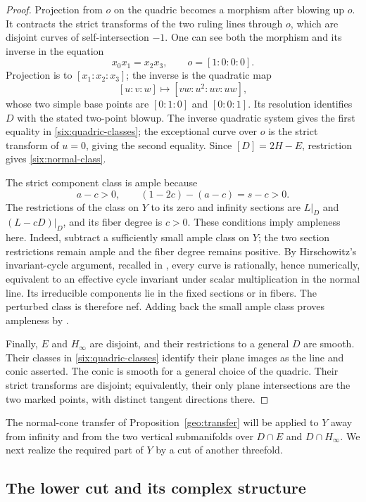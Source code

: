 \begin{proof}
Projection from \(o\) on the quadric becomes a morphism after blowing
up \(o\).  It contracts the strict transforms of the two ruling lines
through \(o\), which are disjoint curves of self-intersection \(-1\).
One can see both the morphism and its inverse in the equation
\[
 x_0x_1=x_2x_3,\qquad o=[1:0:0:0].
\]
Projection is to \([x_1:x_2:x_3]\); the inverse is the quadratic map
\[
 [u:v:w]\longmapsto[vw:u^2:uv:uw],
\]
whose two simple base points are \([0:1:0]\) and \([0:0:1]\).
Its resolution identifies \(D\) with the stated two-point blowup.
The inverse quadratic system gives the first equality in
\eqref{six:quadric-classes}; the exceptional curve over \(o\) is the
strict transform of \(u=0\), giving the second equality.
Since \([D]=2H-E\), restriction gives \eqref{six:normal-class}.

The strict component class is ample because
\[
 a-c>0,\qquad (1-2c)-(a-c)=s-c>0.
\]
The restrictions of the class on \(Y\) to its zero and infinity
sections are \(L|_D\) and \((L-cD)|_D\), and its fiber degree is \(c>0\).
These conditions imply ampleness here.  Indeed, subtract a sufficiently
small ample class on \(Y\); the two section restrictions remain ample
and the fiber degree remains positive. By Hirschowitz's invariant-cycle
argument, recalled in \cite[Section~2]{FultonMacPhersonSottileSturmfels1995},
every curve is rationally, hence numerically, equivalent to an effective
cycle invariant under scalar multiplication in the normal line.
Its irreducible components lie in the fixed sections or in fibers.
The perturbed class is therefore nef. Adding back the small ample
class proves ampleness by \cite[Corollary~1.4.10]{Lazarsfeld2004}.

Finally, \(E\) and \(H_\infty\) are disjoint, and their restrictions
to a general \(D\) are smooth.  Their classes in
\eqref{six:quadric-classes} identify their plane images as the line
and conic asserted.  The conic is smooth for a general choice of the
quadric.  Their strict transforms are disjoint; equivalently, their
only plane intersections are the two marked points, with distinct
tangent directions there.
\end{proof}

The normal-cone transfer of Proposition~\ref{geo:transfer} will be
applied to \(Y\) away from infinity and from the two vertical
submanifolds over \(D\cap E\) and \(D\cap H_\infty\).  We next realize
the required part of \(Y\) by a cut of another threefold.

\subsection{The lower cut and its complex structure}

